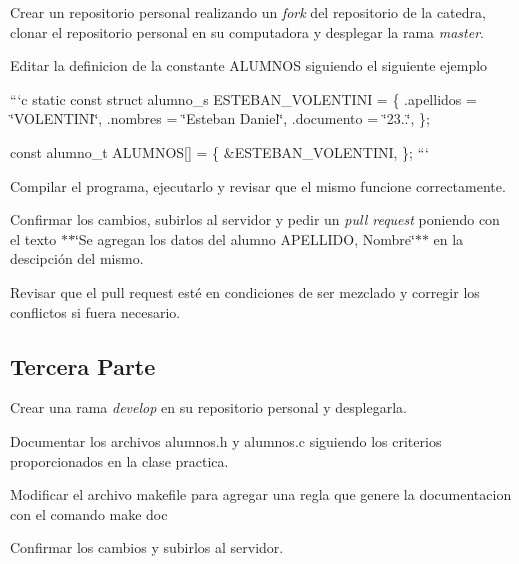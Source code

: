 
\begin{DoxyEnumerate}
\item Crear un repositorio personal realizando un {\itshape fork} del repositorio de la catedra, clonar el repositorio personal en su computadora y desplegar la rama {\itshape master}.
\item Editar la definicion de la constante A\+L\+U\+M\+N\+OS siguiendo el siguiente ejemplo

```c static const struct alumno\+\_\+s E\+S\+T\+E\+B\+A\+N\+\_\+\+V\+O\+L\+E\+N\+T\+I\+NI = \{ .apellidos = \char`\"{}\+V\+O\+L\+E\+N\+T\+I\+N\+I\char`\"{}, .nombres = \char`\"{}\+Esteban Daniel\char`\"{}, .documento = \char`\"{}23..\char`\"{}, \};

const alumno\+\_\+t A\+L\+U\+M\+N\+OS\mbox{[}\mbox{]} = \{ \&E\+S\+T\+E\+B\+A\+N\+\_\+\+V\+O\+L\+E\+N\+T\+I\+NI, \}; ```
\item Compilar el programa, ejecutarlo y revisar que el mismo funcione correctamente.
\item Confirmar los cambios, subirlos al servidor y pedir un {\itshape pull request} poniendo con el texto $\ast$$\ast$\char`\"{}\+Se agregan los datos del alumno A\+P\+E\+L\+L\+I\+D\+O, Nombre\char`\"{}$\ast$$\ast$ en la descipción del mismo.
\item Revisar que el pull request esté en condiciones de ser mezclado y corregir los conflictos si fuera necesario.
\end{DoxyEnumerate}

\subsection*{Tercera Parte}


\begin{DoxyEnumerate}
\item Crear una rama {\itshape develop} en su repositorio personal y desplegarla.
\item Documentar los archivos {\ttfamily alumnos.\+h} y {\ttfamily alumnos.\+c} siguiendo los criterios proporcionados en la clase practica.
\item Modificar el archivo {\ttfamily makefile} para agregar una regla que genere la documentacion con el comando {\ttfamily make doc}
\item Confirmar los cambios y subirlos al servidor. 
\end{DoxyEnumerate}